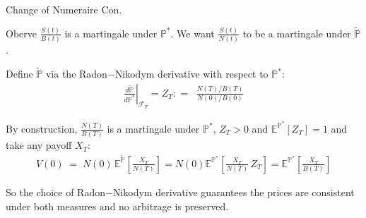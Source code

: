 \documentclass{beamer}
\begin{document}
\begin{frame}{Change of Numeraire Con.}

    {\footnotesize \footnotesize
    \par Oberve $\displaystyle \frac{S(t)}{B(t)}$ is a martingale under $\mathbb{P}^*$. 
    We want $\displaystyle \frac{S(t)}{N(t)}$ to be a martingale under $\tilde{\mathbb{P}}$.
    \par Define $\tilde{\mathbb{P}}$ via the Radon$-$Nikodym derivative with respect to $\mathbb{P}^*$:
    \begin{align*}
        \left.\frac{d\tilde{\mathbb{P}}}{d\mathbb{P}^*}\right|_{\mathcal{F}_T} = Z_T : = \;\;\frac{N(T)/B(T)}{N(0)/B(0)}
    \end{align*}
    \par By construction, $\frac{N(T)}{B(T)}$ is a martingale under $\mathbb{P}^*$, $Z_T >0$ and $\mathbb{E}^{\mathbb{P}^*}[Z_T]=1$ and take any payoff $X_T$:
    \begin{align*}
         V(0) \;=\; N(0)\,\mathbb{E}^{\tilde{\mathbb{P}}}\!\left[\frac{X_T}{N(T)}\right] 
         =N(0) \mathbb{E}^{\mathbb{P}^*}\!\left[\frac{X_T}{N(T)}\,Z_T\right] = \mathbb{E}^{\mathbb{P}^*}\!\left[\frac{X_T}{B(T)}\right]
    \end{align*}
    \vspace{0.5em}
    \par So the choice of Radon$-$Nikodym derivative guarantees the prices are consistent under both measures and no arbitrage is preserved.
    }
    
\end{frame}
\end{document}
